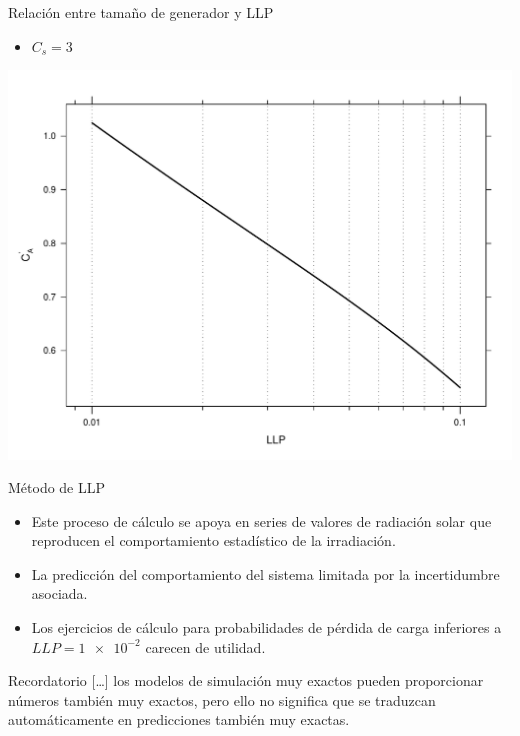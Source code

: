 \documentclass[xcolor={usenames,svgnames,dvipsnames}]{beamer}
\begin{document}
\begin{frame}[label={sec:org75bc169}]{Relación entre tamaño de generador y LLP}
\begin{itemize}
\item \(C_{s}=3\)
\end{itemize}

\begin{center}
\includegraphics[width=.9\linewidth]{../figs/CurvasLLP_Cs3.pdf}
\end{center}
\end{frame}

\begin{frame}[label={sec:orgf700976}]{Método de LLP}
\begin{itemize}
\item Este proceso de cálculo se apoya en series de valores de radiación
solar que reproducen el comportamiento estadístico de la
irradiación.

\item La predicción del comportamiento del sistema limitada por la
incertidumbre asociada.

\item Los ejercicios de cálculo para probabilidades de pérdida de carga
inferiores a \(LLP=\num{1e-2}\) carecen de utilidad.
\end{itemize}

\begin{block}{Recordatorio}
\guillemotleft{}[\ldots{}] los modelos de simulación muy exactos pueden proporcionar números también muy exactos, pero ello no significa que se traduzcan automáticamente en predicciones también muy exactas.\guillemotright{}
\end{block}
\end{frame}
\end{document}
